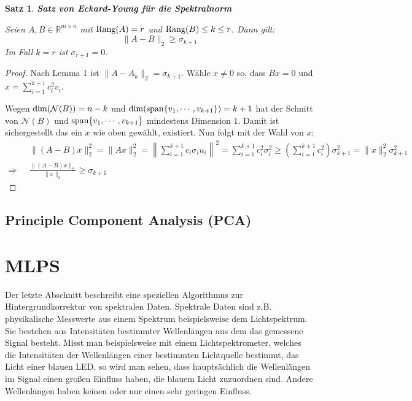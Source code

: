 \documentclass{article}
\newcommand{\R}[0]{\mathbb{R}}
\newtheorem{thm}{Satz}
\begin{document}
\begin{thm} \textbf{Satz von Eckard-Young für die Spektralnorm}

    Seien $A, B \in \R^{m \times n}$ mit ${\rm Rang}(A) = r$ und ${\rm Rang}(B) \leq k \leq r$. Dann gilt:
    \begin{equation}
        \lVert A - B \rVert_2 \geq \sigma_{k+1}
    \end{equation}
    Im Fall $k = r$ ist $\sigma_{r+1} = 0$.
\end{thm}

\begin{proof}
    Nach Lemma 1 ist $\lVert A - A_k \rVert_2 = \sigma_{k+1}$. Wähle $x \neq 0$ so, dass $Bx = 0$ und $x = \sum\limits_{i=1}^{k+1} c_i^2v_i$.

    Wegen ${\rm dim}(\mathcal{N}(B)) = n - k$ und ${\rm dim}({\rm span}\{v_1, \cdots, v_{k+1}\}) = k + 1$ hat der Schnitt von $\mathcal{N}(B)$ und ${\rm span}\{v_1, \cdots, v_{k+1}\}$ mindestens Dimension $1$. 
    Damit ist sichergestellt das ein $x$ wie oben gewählt, existiert. Nun folgt mit der Wahl von $x$:
    \begin{align*}
        &\lVert(A-B)x\rVert_2^2 = \lVert Ax \rVert^2_2 = \left\lVert \sum\limits_{i=1}^{k+1} c_i\sigma_i u_i \right\rVert^2 = \sum\limits_{i=1}^{k+1}c_i^2\sigma_i^2 \geq \left(\sum\limits_{i=1}^{k+1}c_i^2\right)\sigma_{k+1}^2 = \lVert x \rVert_2^2 \sigma_{k+1}^2 \\
    \Rightarrow \:\:\: &\frac{\lVert (A - B)x \rVert_2}{\lVert x \rVert_2} \geq \sigma_{k+1}
    \end{align*}
\end{proof}

\subsection{Principle Component Analysis (PCA)}

\section{MLPS}

Der letzte Abschnitt beschreibt eine speziellen Algorithmus zur Hintergrundkorrektur von spektralen Daten.
Spektrale Daten sind z.B. physikalische Messwerte aus einem Spektrum beispielsweise dem Lichtspektrum. 
Sie bestehen aus Intensitäten bestimmter Wellenlängen aus dem das gemessene Signal besteht. 
Misst man beispielsweise mit einem Lichtspektrometer, welches die Intensitäten der Wellenlängen einer bestimmten Lichtquelle bestimmt, das Licht einer blauen LED,
so wird man sehen, dass hauptsächlich die Wellenlängen im Signal einen großen Einfluss haben, die blauem Licht zuzuordnen sind. Andere Wellenlängen haben keinen oder nur einen sehr geringen Einfluss.
\end{document}
